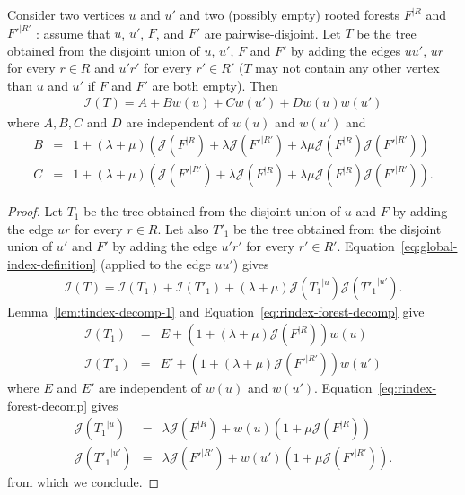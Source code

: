 \documentclass[11 pt]{modarticle}
\newcommand{\wmap}{w}
\newcommand{\rtree}[2]{{#1}^{\lvert #2}}
\newcommand{\indexsymbol}{\mathcal{I}}
\newcommand{\tindex}[1]{\indexsymbol(#1)}
\newcommand{\rindexsymbol}{\mathcal{J}}
\newcommand{\rindex}[2]{\rindexsymbol(\rtree{#2}{#1})}
\begin{document}
\begin{lem}\label{lem:tindex-decomp-3}
Consider two vertices $u$ and $u'$ and two (possibly empty) rooted forests $\rtree{F}{R}$ and $\rtree{F'}{R'}$ : assume that $u$, $u'$, $F$, and $F'$ are pairwise-disjoint. Let $T$ be the tree obtained from the disjoint union of $u$, $u'$, $F$ and $F'$ by adding the edges $uu'$, $ur$ for every $r \in R$ and $u'r'$ for every $r' \in R'$ ($T$ may not contain any other vertex than $u$ and $u'$ if $F$ and $F'$ are both empty). Then
\begin{eqnarray*}
	\tindex{T} = A + B \wmap(u) + C \wmap(u') + D \wmap(u) \wmap(u')
\end{eqnarray*}
where $A,B,C$ and $D$ are independent of $\wmap(u)$ and $\wmap(u')$ and
\begin{eqnarray*}
	B & = & 1 + (\lambda + \mu)\left( \rindex{R}{F} + \lambda \rindex{R'}{F'} + \lambda \mu \rindex{R}{F} \rindex{R'}{F'} \right) \\
	C & = & 1 + (\lambda + \mu)\left( \rindex{R'}{F'} + \lambda \rindex{R}{F} + \lambda \mu \rindex{R}{F} \rindex{R'}{F'} \right) .
\end{eqnarray*}
\end{lem}

\begin{proof}
Let $T_1$ be the tree obtained from the disjoint union of $u$ and $F$ by adding the edge $ur$ for every $r \in R$. Let also $T'_1$ be the tree obtained from the disjoint union of $u'$ and $F'$ by adding the edge $u'r'$ for every $r' \in R'$. Equation~\eqref{eq:global-index-definition} (applied to the edge $uu'$) gives
\begin{eqnarray*}
	\tindex{T} = \tindex{T_1} + \tindex{T'_1} + (\lambda + \mu) \rindex{u}{T_1} \rindex{u'}{T'_1}.
\end{eqnarray*}
Lemma~\ref{lem:tindex-decomp-1} and Equation~\eqref{eq:rindex-forest-decomp} give
\begin{eqnarray*}
	\tindex{T_1} & = & E + \left(1 + (\lambda + \mu)\rindex{R}{F}\right) \wmap(u) \\
	\tindex{T'_1} & = & E' + \left(1 + (\lambda + \mu)\rindex{R'}{F'}\right) \wmap(u')
\end{eqnarray*}
where $E$ and $E'$ are independent of $\wmap(u)$ and $\wmap(u')$. Equation~\eqref{eq:rindex-forest-decomp} gives
\begin{eqnarray*}
	\rindex{u}{T_1} & = & \lambda \rindex{R}{F} + \wmap(u)(1 + \mu \rindex{R}{F}) \\
	\rindex{u'}{T'_1} & = & \lambda \rindex{R'}{F'} + \wmap(u') (1 + \mu \rindex{R'}{F'}).
\end{eqnarray*}
from which we conclude.
\end{proof}
\end{document}

